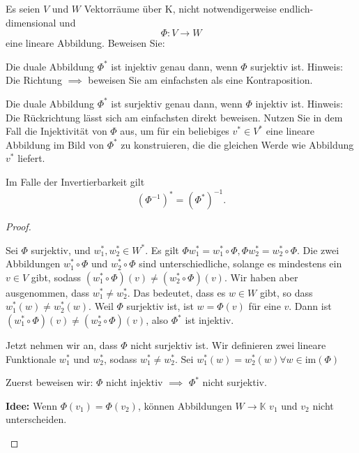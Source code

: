 \begin{Problem}
	Es seien $V$ und $W$ Vektorräume über K, nicht notwendigerweise endlich-dimensional und
	\[
	\Phi:V\to W
	\]
	eine lineare Abbildung. Beweisen Sie:
	\begin{parts}
	\item Die duale Abbildung $\Phi^*$ ist injektiv genau dann, wenn $\Phi$ surjektiv ist.
		{\footnotesize Hinweis: Die Richtung $\implies$ beweisen Sie am einfachsten als eine Kontraposition.}
	\item Die duale Abbildung $\Phi^*$ ist surjektiv genau dann, wenn $\Phi$ injektiv ist.
		{\footnotesize Hinweis: Die Rückrichtung lässt sich am einfachsten direkt beweisen. Nutzen Sie in dem Fall die Injektivität von $\Phi$ aus, um f\"{u}r ein beliebiges $v^*\in V^*$ eine lineare Abbildung im Bild von $\Phi^*$ zu konstruieren, die die gleichen Werde wie Abbildung $v^*$ liefert.}
	\item Im Falle der Invertierbarkeit gilt
		\[
			\left( \Phi^{-1} \right) ^*=\left( \Phi^* \right) ^{-1}
		.\] 
	\end{parts}
\end{Problem}
\begin{proof}
	\begin{parts}
	\item Sei $\Phi$ surjektiv, und $w_1^*,w_2^*\in W^*$. Es gilt $\Phi w_1^*=w_1^*\circ \Phi, \Phi w_2^*=w_2^*\circ \Phi$. Die zwei Abbildungen  $w_1^*\circ \Phi$ und $w_2^*\circ \Phi$ sind unterschiedliche, solange es mindestens ein $v\in V$ gibt, sodass $(w_1^*\circ\Phi)(v)\neq (w_2^*\circ\Phi)(v)$. Wir haben aber ausgenommen, dass $w_1^*\neq w_2^*$. Das bedeutet, dass es $w\in W$ gibt, so dass $w_1^*(w)\neq w_2^*(w)$. Weil $\Phi$ surjektiv ist, ist $w=\Phi(v)$ f\"{u}r eine $v$. Dann ist $(w_1^*\circ\Phi)(v)\neq (w_2^*\circ\Phi)(v)$, also  $\Phi^*$ ist injektiv.

		Jetzt nehmen wir an, dass $\Phi$ nicht surjektiv ist. Wir definieren zwei lineare Funktionale $w_1^*$ und $w_2^*$, sodass $w_1^*\neq w_2^*$. Sei $w_1^*(w)=w_2^*(w)\forall w\in\text{im}(\Phi)$ 
	\item Zuerst beweisen wir: $\Phi$ nicht injektiv $\implies$ $\Phi^*$ nicht surjektiv.
		\begin{tcolorbox}
			\textbf{Idee:} Wenn $\Phi(v_1)=\Phi(v_2)$, k\"{o}nnen Abbildungen $W\to \mathbb{K}$ $v_1$ und $v_2$ nicht unterscheiden.
		\end{tcolorbox}
	\end{parts}
\end{proof}
